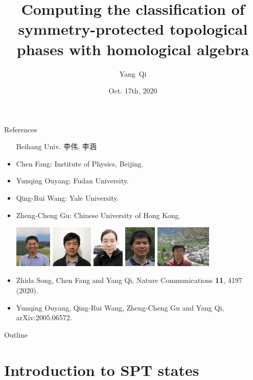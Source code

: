 \documentclass[xcolor=table, aspectratio=169,ignorenonframetext]{beamer}
\title %
{Computing the classification of symmetry-protected topological phases with homological algebra}
\author[Y Qi] %
{Yang~Qi}
\institute[Fudan] %
{
Department of Physics, Fudan University.
}
\date{Oct. 17th, 2020}
\begin{document}
\begin{frame}
  \titlepage
\end{frame}

\begin{frame}{References}
\begin{itemize}
\item[Beihang Univ.] 李伟, 李涵
\item Chen Fang: Institute of Physics, Beijing.
\item Yunqing Ouyang: Fudan University.
\item Qing-Rui Wang: Yale University.
\item Zheng-Cheng Gu: Chinese University of Hong Kong.
\begin{center}
	\includegraphics[height=2cm]{../people/zhidasong}
	\includegraphics[height=2cm]{../people/chenfang}
        \includegraphics[height=2cm]{../people/yunqing}
        \includegraphics[height=2cm]{../people/qingrui}
        \includegraphics[height=2cm]{../people/zhengcheng}
\end{center}
\item Zhida Song, Chen Fang and Yang Qi, Nature Communications \textbf{11}, 4197 (2020).
\item Yunqing Ouyang, Qing-Rui Wang, Zheng-Cheng Gu and Yang Qi, arXiv:2005.06572.
\end{itemize}
\end{frame}

\begin{frame}{Outline}
		\tableofcontents
\end{frame}

\section{Introduction to SPT states}
\end{document}
